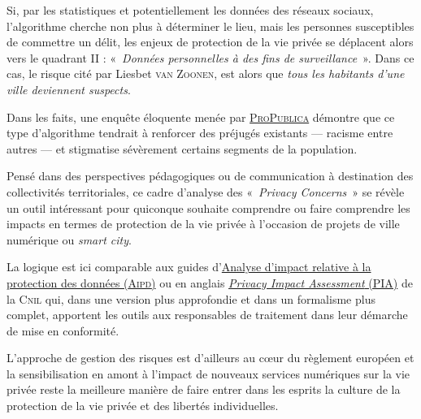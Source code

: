Si, par les statistiques et potentiellement les données des réseaux sociaux, l’algorithme cherche non plus à déterminer le lieu, mais les personnes susceptibles de commettre un délit, les enjeux de protection de la vie privée se déplacent alors vers le quadrant II : «~\emph{Données personnelles à des fins de surveillance}~». Dans ce cas, le risque cité par Liesbet \textsc{van Zoonen}, est alors que \emph{tous les habitants d’une ville deviennent suspects}.

Dans les faits, une enquête éloquente menée par \href{http://www.internetactu.net/a-lire-ailleurs/144849747113/}{\textsc{ProPublica}} démontre que ce type d’algorithme tendrait à renforcer des préjugés existants --- racisme entre autres --- et stigmatise sévèrement certains segments de la population.



Pensé dans des perspectives pédagogiques ou de communication à destination des collectivités territoriales, ce cadre d’analyse des «~\textit{Privacy Concerns}~» se révèle un outil intéressant pour quiconque souhaite comprendre ou faire comprendre les impacts en termes de protection de la vie privée à l'occasion de projets de ville numérique ou \textit{smart city}. 

La logique est ici comparable aux guides d'\href{https://www.cnil.fr/fr/RGPD-analyse-impact-protection-des-donnees-aipd}{Analyse d'impact relative à la protection des données (\textsc{Aipd})} ou en anglais \href{https://www.cnil.fr/en/privacy-impact-assessment-pia}{\textit{Privacy Impact Assessment} (PIA)} de la \textsc{Cnil} qui, dans une version plus approfondie et dans un formalisme plus complet, apportent les outils aux responsables de traitement dans leur démarche de mise en conformité.

L’approche de gestion des risques est d’ailleurs au cœur du règlement européen et la sensibilisation en amont à l’impact de nouveaux services numériques sur la vie privée reste la meilleure manière de faire entrer dans les esprits la culture de la protection de la vie privée et des libertés individuelles.


